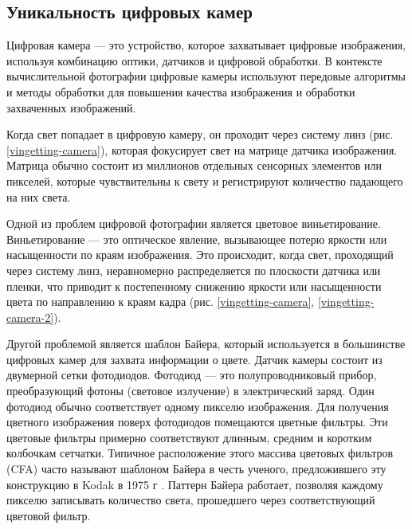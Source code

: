 \subsection{Уникальность цифровых камер}\label{sect-1-2}

Цифровая камера — это устройство, которое захватывает цифровые изображения, используя комбинацию оптики, датчиков и цифровой обработки. В контексте вычислительной фотографии цифровые камеры используют передовые алгоритмы и методы обработки для повышения качества изображения и обработки захваченных изображений.


Когда свет попадает в цифровую камеру, он проходит через систему линз (рис. \ref{vingetting-camera}), которая фокусирует свет на матрице датчика изображения. Матрица обычно состоит из миллионов отдельных сенсорных элементов или пикселей, которые чувствительны к свету и регистрируют количество падающего на них света.

Одной из проблем цифровой фотографии является цветовое виньетирование. Виньетирование — это оптическое явление, вызывающее потерю яркости или насыщенности по краям изображения. Это происходит, когда свет, проходящий через систему линз, неравномерно распределяется по плоскости датчика или пленки, что приводит к постепенному снижению яркости или насыщенности цвета по направлению к краям кадра (рис. \ref{vingetting-camera}, \ref{vingetting-camera-2}).


Другой проблемой является шаблон Байера, который используется в большинстве цифровых камер для захвата информации о цвете. Датчик камеры состоит из двумерной сетки фотодиодов. Фотодиод — это полупроводниковый прибор, преобразующий фотоны (световое излучение) в электрический заряд. Один фотодиод обычно соответствует одному пикселю изображения. Для получения цветного изображения поверх фотодиодов помещаются цветные фильтры. Эти цветовые фильтры примерно соответствуют длинным, средним и коротким колбочкам сетчатки. Типичное расположение этого массива цветовых фильтров (CFA) часто называют шаблоном Байера в честь ученого, предложившего эту конструкцию в Kodak в 1975 г \cite{lib-bayer}. Паттерн Байера работает, позволяя каждому пикселю записывать количество света, прошедшего через соответствующий цветовой фильтр. 


